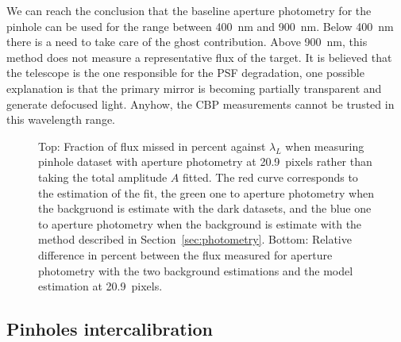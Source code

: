 We can reach the conclusion that the baseline aperture photometry for the \spinhole pinhole can be used for the range between \SI{400}{\nano\meter} and \SI{900}{\nano\meter}. Below \SI{400}{\nano\meter} there is a need to take care of the ghost contribution. Above \SI{900}{\nano\meter}, this method does not measure a representative flux of the target. It is believed that the \SD telescope is the one responsible for the PSF degradation, one possible explanation is that the primary mirror is becoming partially transparent and generate defocused light. Anyhow, the CBP measurements cannot be trusted in this wavelength range. 

\begin{figure}[h]
     \centering
     \caption{Top: Fraction of flux missed in percent against $\lambda_L$ when measuring \spinhole pinhole dataset with aperture photometry at \SI{20.9}{pixels} rather than taking the total amplitude $A$ fitted. The red curve corresponds to the estimation of the fit, the green one to aperture photometry when the backgruond is estimate with the dark datasets, and the blue one to aperture photometry when the background is estimate with the method described in Section~\ref{sec:photometry}. Bottom: Relative difference in percent between the flux measured for aperture photometry with the two background estimations and the model estimation at \SI{20.9}{pixels}.}
     \label{fig:bias_aperture}
\end{figure}

\subsection{Pinholes intercalibration}

